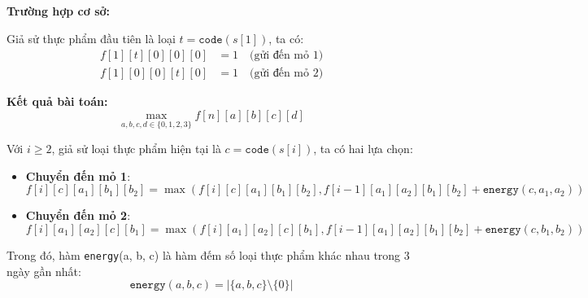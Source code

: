\textbf{Trường hợp cơ sở:}

Giả sử thực phẩm đầu tiên là loại $t = \texttt{code}(s[1])$, ta có:
\begin{align*}
f[1][t][0][0][0] &= 1 \quad \text{(gửi đến mỏ 1)} \\
f[1][0][0][t][0] &= 1 \quad \text{(gửi đến mỏ 2)}
\end{align*}

\textbf{Kết quả bài toán:} 
\[
\max_{a,b,c,d \in \{0,1,2,3\}} f[n][a][b][c][d]
\]

Với $i \geq 2$, giả sử loại thực phẩm hiện tại là $c = \texttt{code}(s[i])$, ta có hai lựa chọn:

\begin{itemize}
    \item \textbf{Chuyển đến mỏ 1}:
    \[
    f[i][c][a_1][b_1][b_2] = \max(f[i][c][a_1][b_1][b_2], f[i - 1][a_1][a_2][b_1][b_2] + \texttt{energy}(c, a_1, a_2))
    \]

    \item \textbf{Chuyển đến mỏ 2}:
    \[
    f[i][a_1][a_2][c][b_1] = \max(f[i][a_1][a_2][c][b_1], f[i - 1][a_1][a_2][b_1][b_2] + \texttt{energy}(c, b_1, b_2))
    \]
\end{itemize}

Trong đó, hàm \texttt{energy}(a, b, c) là hàm đếm số loại thực phẩm khác nhau trong 3 ngày gần nhất:
\[
\texttt{energy}(a, b, c) = \left| \{a, b, c\} \setminus \{0\} \right|
\]


